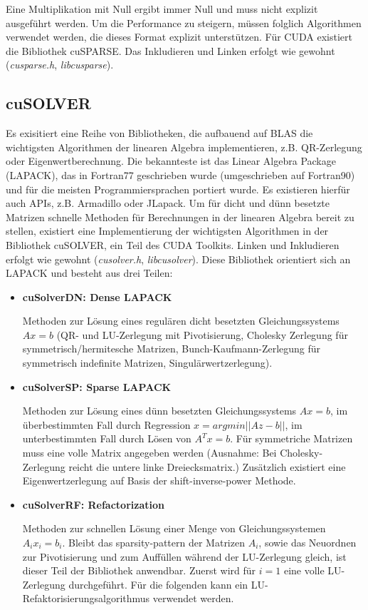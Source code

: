 		Eine Multiplikation mit Null ergibt immer Null und muss nicht explizit ausgeführt werden. Um die Performance zu steigern, müssen folglich Algorithmen verwendet werden, die dieses Format explizit unterstützen. Für CUDA existiert die Bibliothek cuSPARSE. Das Inkludieren und Linken erfolgt wie gewohnt (\textit{cusparse.h}, \textit{libcusparse}).
		
		\subsection{cuSOLVER}
		Es exisitiert eine Reihe von Bibliotheken, die aufbauend auf BLAS die wichtigsten Algorithmen der linearen Algebra implementieren, z.B. QR-Zerlegung oder Eigenwertberechnung. Die bekannteste ist das Linear Algebra Package (LAPACK), das in Fortran77 geschrieben wurde (umgeschrieben auf Fortran90) und für die meisten Programmiersprachen portiert wurde. Es existieren hierfür auch \Glspl{API}, z.B. Armadillo oder JLapack.
		Um für dicht und dünn besetzte Matrizen schnelle Methoden für Berechnungen in der linearen Algebra bereit zu stellen, existiert eine Implementierung der wichtigsten Algorithmen in der Bibliothek cuSOLVER, ein Teil des CUDA Toolkits. Linken und Inkludieren erfolgt wie gewohnt (\textit{cusolver.h}, \textit{libcusolver}). Diese Bibliothek orientiert sich an LAPACK und besteht aus drei Teilen:
		\begin{itemize}
		\item \textbf{cuSolverDN: Dense LAPACK} 
		
		Methoden zur Lösung eines regulären dicht besetzten Gleichungssystems $Ax = b$ (QR- und LU-Zerlegung mit Pivotisierung, Cholesky Zerlegung für symmetrisch/hermitesche Matrizen, Bunch-Kaufmann-Zerlegung für symmetrisch indefinite Matrizen, Singulärwertzerlegung).
		
		\item \textbf{cuSolverSP: Sparse LAPACK}
		
		Methoden zur Lösung eines dünn besetzten Gleichungssystems $Ax = b$, im überbestimmten Fall durch Regression $x = argmin||Az-b||$, im unterbestimmten Fall durch Lösen von $A^Tx=b$. Für symmetriche Matrizen muss eine volle Matrix angegeben werden (Ausnahme: Bei Cholesky-Zerlegung reicht die untere linke Dreiecksmatrix.) Zusätzlich existiert eine Eigenwertzerlegung auf Basis der shift-inverse-power Methode.
		
		\item \textbf{cuSolverRF: Refactorization}
		
		Methoden zur schnellen Lösung einer Menge von Gleichungssystemen $A_i x_i = b_i$. Bleibt das sparsity-pattern der Matrizen $A_i$, sowie das Neuordnen zur Pivotisierung und zum Auffüllen während der LU-Zerlegung gleich, ist dieser Teil der Bibliothek anwendbar. Zuerst wird für $i=1$ eine volle LU-Zerlegung durchgeführt. Für die folgenden kann ein LU-Refaktorisierungsalgorithmus verwendet werden.	
		\end{itemize}
		

